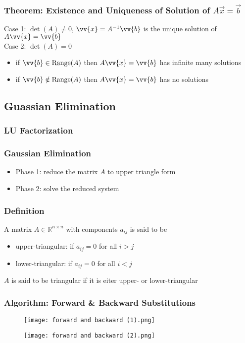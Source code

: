 \documentclass[11pt]{article}
\newcommand{\R}{{\mathbb{R}}}
\newcommand{\range}{\operatorname{Range}}
\newcommand{\vb}{\vv{b}}
\newcommand{\vx}{\vv{x}}
\begin{document}
\subsubsection{Theorem: Existence and Uniqueness of Solution of $A\vec{x} = \vec{b}$}
Case 1: $\det(A)\neq0$, $\vx = A^{-1}\vb$ is the unique solution of $A\vx = \vb$ \\
Case 2: $\det(A)=0$
\begin{itemize}
  \item if $\vb\in\range(A)$ then $A\vx=\vb$ has infinite many solutions
  \item if $\vb\notin\range(A)$ then $A\vx=\vb$ has no solutions 
\end{itemize}
\subsection{Guassian Elimination}
\subsubsection{LU Factorization}
\subsubsection*{Gaussian Elimination}
\begin{itemize}
  \item Phase 1: reduce the matrix $A$ to upper triangle form 
  \item Phase 2: solve the reduced system 
\end{itemize}
\subsubsection*{Definition}
A matrix $A\in\R^{n\times n}$ with components $a_{ij}$ is said to be 
\begin{itemize}
  \item upper-triangular: if $a_{ij}=0$ for all $i>j$
  \item lower-triangular: if $a_{ij}=0$ for all $i<j$
\end{itemize}
$A$ is said to be triangular if it is eiter upper- or lower-triangular
\subsubsection*{Algorithm: Forward \& Backward Substitutions}
\newpage 
\begin{figure}[tbhp]
	\begin{center}
		\texttt{[image: forward and backward (1).png]}
	\end{center}
	\label{figcaption}
\end{figure}
\begin{figure}[tbhp]
	\begin{center}
		\texttt{[image: forward and backward (2).png]}
	\end{center}
	\label{figcaption}
\end{figure}
\newpage 
\end{document}
